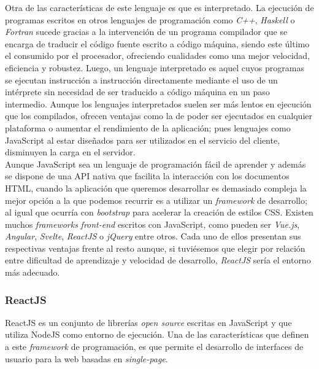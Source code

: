 \documentclass[../main.tex]{subfiles}
\begin{document}
    Otra de las características de este lenguaje es que es interpretado. La ejecución de programas escritos en otros lenguajes de programación como \textit{C++}, \textit{Haskell} o \textit{Fortran} sucede gracias a la intervención de un programa compilador que se encarga de traducir el código fuente escrito a código máquina, siendo este último el consumido por el procesador, ofreciendo cualidades como una mejor velocidad, eficiencia y robustez. Luego, un lenguaje interpretado es aquel cuyos programas se ejecutan instrucción a instrucción directamente mediante el uso de un intérprete sin necesidad de ser traducido a código máquina en un paso intermedio. Aunque los lenguajes interpretados suelen ser más lentos en ejecución que los compilados, ofrecen ventajas como la de poder ser ejecutados en cualquier plataforma o aumentar el rendimiento de la aplicación; pues lenguajes como JavaScript al estar diseñados para ser utilizados en el servicio del cliente, disminuyen la carga en el servidor. \\
    

    Aunque JavaScript sea un lenguaje de programación fácil de aprender y además se dispone de una API nativa que facilita la interacción con los documentos HTML, cuando la aplicación que queremos desarrollar es demasiado compleja la mejor opción a la que podemos recurrir es a utilizar un \textit{framework} de desarrollo; al igual que ocurría con \textit{bootstrap} para acelerar la creación de estilos CSS. Existen muchos \textit{frameworks} \textit{front-end} escritos con JavaScript, como pueden ser \textit{Vue.js}, \textit{Angular}, \textit{Svelte}, \textit{ReactJS} o \textit{jQuery} entre otros. Cada uno de ellos presentan sus respectivas ventajas frente al resto aunque, si tuviésemos que elegir por relación entre dificultad de aprendizaje y velocidad de desarrollo, \textit{ReactJS} sería el entorno más adecuado.
    

    \subsubsection{ReactJS}
    

    ReactJS es un conjunto de librerías \textit{open source} escritas en JavaScript y que utiliza NodeJS como entorno de ejecución. Una de las características que definen a este \textit{framework} de programación, es que permite el desarrollo de interfaces de usuario para la web basadas en \textit{single-page}. \\
    
\end{document}
